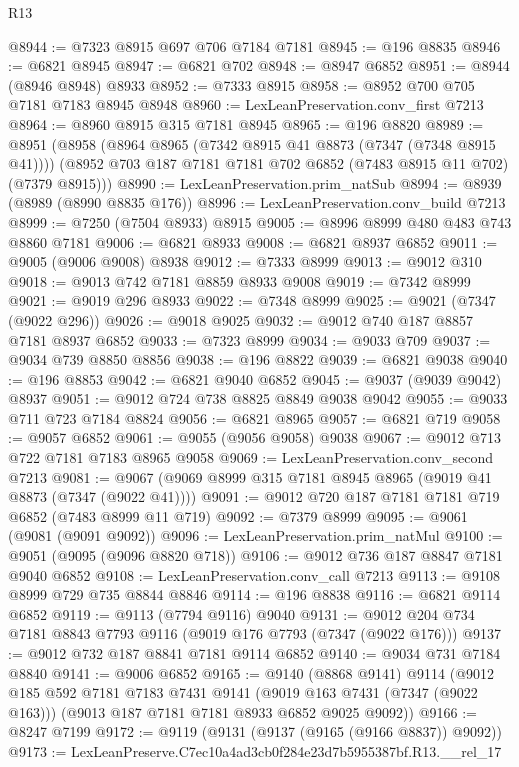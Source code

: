 \begin{lexlean}{R13}
\begin{coremodule}
@8944 := @7323 @8915 @697 @706 @7184 @7181
@8945 := @196 @8835
@8946 := @6821 @8945
@8947 := @6821 @702
@8948 := @8947 @6852
@8951 := @8944 (@8946 @8948) @8933
@8952 := @7333 @8915
@8958 := @8952 @700 @705 @7181 @7183 @8945 @8948
@8960 := LexLeanPreservation.conv_first @7213
@8964 := @8960 @8915 @315 @7181 @8945
@8965 := @196 @8820
@8989 := @8951
    (@8958
      (@8964 @8965 (@7342 @8915 @41 @8873 (@7347 (@7348 @8915 @41))))
      (@8952 @703 @187 @7181 @7181 @702 @6852 (@7483 @8915 @11 @702) (@7379 @8915)))
@8990 := LexLeanPreservation.prim_natSub
@8994 := @8939 (@8989 (@8990 @8835 @176))
@8996 := LexLeanPreservation.conv_build @7213
@8999 := @7250 (@7504 @8933) @8915
@9005 := @8996 @8999 @480 @483 @743 @8860 @7181
@9006 := @6821 @8933
@9008 := @6821 @8937 @6852
@9011 := @9005 (@9006 @9008) @8938
@9012 := @7333 @8999
@9013 := @9012 @310
@9018 := @9013 @742 @7181 @8859 @8933 @9008
@9019 := @7342 @8999
@9021 := @9019 @296 @8933
@9022 := @7348 @8999
@9025 := @9021 (@7347 (@9022 @296))
@9026 := @9018 @9025
@9032 := @9012 @740 @187 @8857 @7181 @8937 @6852
@9033 := @7323 @8999
@9034 := @9033 @709
@9037 := @9034 @739 @8850 @8856
@9038 := @196 @8822
@9039 := @6821 @9038
@9040 := @196 @8853
@9042 := @6821 @9040 @6852
@9045 := @9037 (@9039 @9042) @8937
@9051 := @9012 @724 @738 @8825 @8849 @9038 @9042
@9055 := @9033 @711 @723 @7184 @8824
@9056 := @6821 @8965
@9057 := @6821 @719
@9058 := @9057 @6852
@9061 := @9055 (@9056 @9058) @9038
@9067 := @9012 @713 @722 @7181 @7183 @8965 @9058
@9069 := LexLeanPreservation.conv_second @7213
@9081 := @9067 (@9069 @8999 @315 @7181 @8945 @8965 (@9019 @41 @8873 (@7347 (@9022 @41))))
@9091 := @9012 @720 @187 @7181 @7181 @719 @6852 (@7483 @8999 @11 @719)
@9092 := @7379 @8999
@9095 := @9061 (@9081 (@9091 @9092))
@9096 := LexLeanPreservation.prim_natMul
@9100 := @9051 (@9095 (@9096 @8820 @718))
@9106 := @9012 @736 @187 @8847 @7181 @9040 @6852
@9108 := LexLeanPreservation.conv_call @7213
@9113 := @9108 @8999 @729 @735 @8844 @8846
@9114 := @196 @8838
@9116 := @6821 @9114 @6852
@9119 := @9113 (@7794 @9116) @9040
@9131 := @9012 @204 @734 @7181 @8843 @7793 @9116 (@9019 @176 @7793 (@7347 (@9022 @176)))
@9137 := @9012 @732 @187 @8841 @7181 @9114 @6852
@9140 := @9034 @731 @7184 @8840
@9141 := @9006 @6852
@9165 := @9140
    (@8868 @9141)
    @9114
    (@9012
      @185
      @592
      @7181
      @7183
      @7431
      @9141
      (@9019 @163 @7431 (@7347 (@9022 @163)))
      (@9013 @187 @7181 @7181 @8933 @6852 @9025 @9092))
@9166 := @8247 @7199
@9172 := @9119 (@9131 (@9137 (@9165 (@9166 @8837)) @9092))
@9173 := LexLeanPreserve.C7ec10a4ad3cb0f284e23d7b5955387bf.R13.__rel_17

\end{coremodule}
\end{lexlean}

